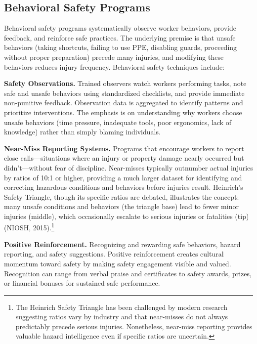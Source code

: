 \documentclass[11pt,openany]{book}
\begin{document}
\subsection{Behavioral Safety Programs}

Behavioral safety programs systematically observe worker behaviors, provide
feedback, and reinforce safe practices. The underlying premise is that unsafe
behaviors (taking shortcuts, failing to use PPE, disabling guards, proceeding
without proper preparation) precede many injuries, and modifying these
behaviors reduces injury frequency. Behavioral safety techniques include:

\textbf{Safety Observations.} Trained observers watch workers performing
tasks, note safe and unsafe behaviors using standardized checklists, and
provide immediate non-punitive feedback. Observation data is aggregated to
identify patterns and prioritize interventions. The emphasis is on
understanding why workers choose unsafe behaviors (time pressure, inadequate
tools, poor ergonomics, lack of knowledge) rather than simply blaming
individuals.

\textbf{Near-Miss Reporting Systems.} Programs that encourage workers to
report close calls---situations where an injury or property damage nearly
occurred but didn't---without fear of discipline. Near-misses typically
outnumber actual injuries by ratios of 10:1 or higher, providing a much larger
dataset for identifying and correcting hazardous conditions and behaviors
before injuries result. Heinrich's Safety Triangle, though its specific ratios
are debated, illustrates the concept: many unsafe conditions and behaviors
(the triangle base) lead to fewer minor injuries (middle), which occasionally
escalate to serious injuries or fatalities (tip) (NIOSH,
2015).\footnote{The Heinrich Safety Triangle has been challenged by modern
research suggesting ratios vary by industry and that near-misses do not always
predictably precede serious injuries. Nonetheless, near-miss reporting
provides valuable hazard intelligence even if specific ratios are uncertain.}

\textbf{Positive Reinforcement.} Recognizing and rewarding safe behaviors,
hazard reporting, and safety suggestions. Positive reinforcement creates
cultural momentum toward safety by making safety engagement visible and
valued. Recognition can range from verbal praise and certificates to safety
awards, prizes, or financial bonuses for sustained safe performance.
\end{document}
